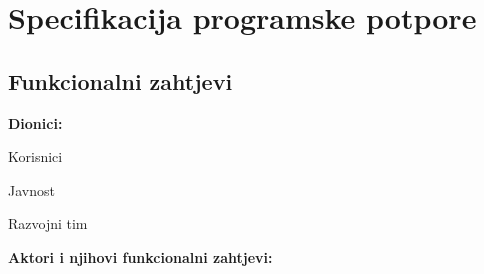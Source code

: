 
\chapter{Specifikacija programske potpore}

\section{Funkcionalni zahtjevi}

\noindent \textbf{Dionici:}

\begin{packed_enum}
	
	\item Korisnici	
	\item Javnost	
	\item Razvojni tim
	
\end{packed_enum}

\noindent \textbf{Aktori i njihovi funkcionalni zahtjevi:}


